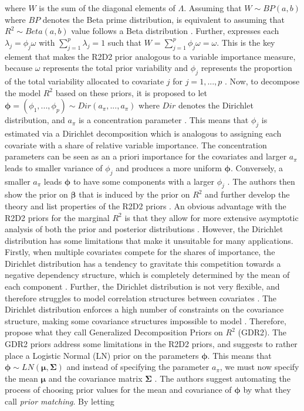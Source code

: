 where $W$ is the sum of the diagonal elements of $\Lambda$. Assuming that $W \sim BP(a, b)$ where $BP$ denotes the Beta prime distribution, is equivalent to assuming that $R^2 \sim Beta(a, b)$ value follows a Beta distribution \citep{zhang2020bayesian}. Further, \citet{zhang2020bayesian} expresses each $\lambda_j=\phi_j\omega$ with $\sum_{j=1}^p \lambda_j=1$ such that $W=\sum_{j=1}^p \phi_j\omega=\omega$. This is the key element that makes the R2D2 prior analogous to a variable importance measure, because $\omega$ represents the total prior variability and $\phi_j$ represents the proportion of the total variability allocated to covariate $j$ for $j=1, ..., p$ \citep{zhang2020bayesian}. Now, to decompose the model $R^2$ based on these priors, it is proposed to let $\boldsymbol{\phi}=(\phi_1, ..., \phi_p) \sim Dir(a_{\pi}, ..., a_{\pi})$ where $Dir$ denotes the Dirichlet distribution, and $a_{\pi}$ is a concentration parameter \citep{zhang2020bayesian}. This means that $\phi_j$ is estimated via a Dirichlet decomposition which is analogous to assigning each covariate with a share of relative variable importance. The concentration parameters can be seen as an a priori importance for the covariates \citep{aguilar2024generalized} and larger $a_{\pi}$ leads to smaller variance of $\phi_j$ and produces a more uniform $\boldsymbol{\phi}$. Conversely, a smaller $a_{\pi}$ leads $\boldsymbol{\phi}$ to have some components with a larger $\phi_j$ \citep{zhang2020bayesian}. The authors then show the prior on $\boldsymbol{\beta}$ that is induced by the prior on $R^2$ and further develop the theory and list properties of the R2D2 priors \citep{zhang2020bayesian}. An obvious advantage with the R2D2 priors for the marginal $R^2$ is that they allow for more extensive asymptotic analysis of both the prior and posterior distributions \citep{zhang2020bayesian}. However, the Dirichlet distribution has some limitations that make it unsuitable for many applications. Firstly, when multiple covariates compete for the shares of importance, the Dirichlet distribution has a tendency to gravitate this competition towards a negative dependency structure, which is completely determined by the mean of each component \citep{aguilar2024generalized}. Further, the Dirichlet distribution is not very flexible, and therefore struggles to model correlation structures between covariates \citep[and references therein]{aguilar2024generalized}. The Dirichlet distribution enforces a high number of constraints on the covariance structure, making some covariance structures impossible to model \citep{aguilar2024generalized}. Therefore, \citet{aguilar2024generalized} propose what they call Generalized Decomposition Priors on $R^2$ (GDR2). The GDR2 priors address some limitations in the R2D2 priors, and suggests to rather place a Logistic Normal (LN) prior on the parameters $\boldsymbol{\phi}$. This means that $\boldsymbol{\phi} \sim LN(\boldsymbol{\mu}, \boldsymbol{\Sigma})$ and instead of specifying the parameter $a_{\pi}$, we must now specify the mean $\boldsymbol{\mu}$ and the covariance matrix $\boldsymbol{\Sigma}$ \citep{aguilar2024generalized}. The authors suggest automating the process of choosing prior values for the mean and covariance of $\boldsymbol{\phi}$ by what they call \textit{prior matching}. By letting 